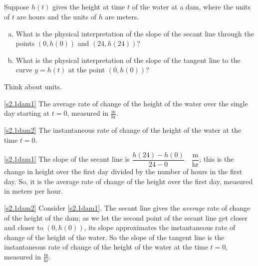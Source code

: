 %
%
\subsection*{\Procedural}


\begin{Mquestion}
Suppose $h(t)$ gives the height at time $t$ of the water at a dam, where the units of $t$ are hours and the units of $h$ are meters.
\begin{enumerate}[(a)]
\item\label{s2.1dam1} What is the physical interpretation of the slope of the secant line through the points $(0,h(0))$ and $(24,h(24))$?
\item\label{s2.1dam2} What is the physical interpretation of the slope of the tangent line to the curve $y=h(t)$ at the point $(0,h(0))$?
\end{enumerate}
\end{Mquestion}
\begin{hint}
Think about units.
\end{hint}
\begin{answer}
\eqref{s2.1dam1} The average rate of change of the height of the water over the single day starting at $t=0$, measured in $\frac{\mathrm{m}}{\mathrm{hr}}$.

\eqref{s2.1dam2} The instantaneous rate of change of the height of the water at the time $t=0$.
\end{answer}
\begin{solution}
\eqref{s2.1dam1} The slope of the secant line is $\dfrac{h(24)-h(0)}{24-0} \quad \dfrac{\mathrm{m}}{\mathrm{hr}}$; this is the change in height over the first day divided by the number of hours in the first day. So, it is the average rate of change of the height over the first day, measured in meters per hour.

\eqref{s2.1dam2} Consider \eqref{s2.1dam1}. The secant line gives the \emph{average} rate of change of the height of the dam; as we let the second point of the secant line get closer and closer to $(0,h(0))$, its slope approximates the instantaneous rate of change of the height of the water. So the slope of the tangent line is the  instantaneous rate of change of the height of the water at the time $t=0$, measured in $\frac{\mathrm{m}}{\mathrm{hr}}$.
\end{solution}

